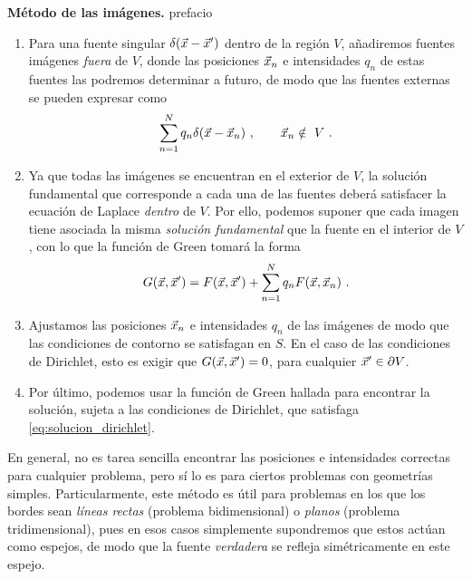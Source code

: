 \begin{propo} 
    \textbf{Método de las imágenes.} prefacio

    \begin{enumerate}
        \item Para una fuente singular $\delta(\vec{x} - \vec{x}')$ dentro de la región $V$, añadiremos fuentes imágenes \emph{fuera} de $V$, donde las posiciones $\vec{x}_n$ e intensidades $q_n$ de estas fuentes las podremos determinar a futuro, de modo que las fuentes externas se pueden expresar como
        \begin{equation}
            \sum_{n=1}^N q_n \delta(\vec{x} - \vec{x}_n) \ , \qquad \vec{x}_n \notin \ V \ .
        \end{equation}
    
        \item Ya que todas las imágenes se encuentran en el exterior de $V$, la solución fundamental que corresponde a cada una de las fuentes deberá satisfacer la ecuación de Laplace \emph{dentro} de $V$. Por ello, podemos suponer que cada imagen tiene asociada la misma \emph{solución fundamental} que la fuente en el interior de $V$, con lo que la función de Green tomará la forma
        \begin{equation}
            G(\vec{x}, \vec{x}') = F(\vec{x}, \vec{x}') + \sum_{n=1}^N q_n F(\vec{x},\vec{x}_n) \ .
        \end{equation}
    
        \item Ajustamos las posiciones $\vec{x}_n$ e intensidades $q_n$ de las imágenes de modo que las condiciones de contorno se satisfagan en $S$. En el caso de las condiciones de Dirichlet, esto es exigir que $G(\vec{x}, \vec{x}') = 0$, para cualquier $\vec{x}' \in \partial V$.
    
        \item Por último, podemos usar la función de Green hallada para encontrar la solución, sujeta a las condiciones de Dirichlet, que satisfaga \eqref{eq:solucion_dirichlet}.
    \end{enumerate}
\end{propo}

En general, no es tarea sencilla encontrar las posiciones e intensidades correctas para cualquier problema, pero sí lo es para ciertos problemas con geometrías simples. Particularmente, este método es útil para problemas en los que los bordes sean \emph{líneas rectas} (problema bidimensional) o \emph{planos} (problema tridimensional), pues en esos casos simplemente supondremos que estos actúan como espejos, de modo que la fuente \emph{verdadera} se refleja simétricamente en este espejo.

